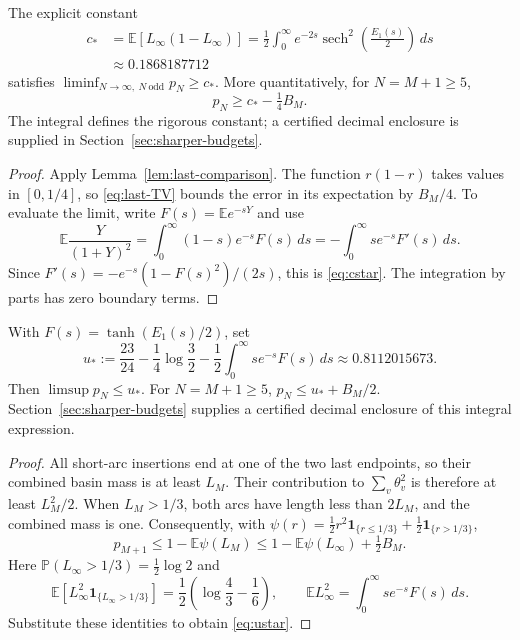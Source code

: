 \documentclass[11pt,letterpaper]{article}
\newcommand{\PP}{\mathbb P}\newcommand{\EE}{\mathbb E}
\newcommand{\ind}{\mathbf 1}\newcommand{\Exp}{\operatorname{Exp}}
\begin{document}
\begin{corollary}\label{cor:strong-noise}
The explicit constant
\begin{align}
 c_*&=\EE[L_\infty(1-L_\infty)]
 =\frac12\int_0^\infty e^{-2s}
          \operatorname{sech}^2\!\left(\frac{E_1(s)}2\right)\,ds
 \label{eq:cstar}\\
 &\approx0.1868187712\nonumber
\end{align}
satisfies $\liminf_{N\to\infty,\ N\ \mathrm{odd}}p_N\ge c_*$.
More quantitatively, for $N=M+1\ge5$,
\begin{equation}\label{eq:strong-finite}
 p_N\ge c_*-\tfrac14B_M.
\end{equation}
The integral defines the rigorous constant; a certified decimal
enclosure is supplied in Section~\ref{sec:sharper-budgets}.
\end{corollary}
\begin{proof}
Apply Lemma~\ref{lem:last-comparison}. The function $r(1-r)$ takes values
in $[0,1/4]$, so \eqref{eq:last-TV} bounds the error in its expectation
by $B_M/4$. To evaluate the limit, write $F(s)=\EE e^{-sY}$ and use
\[
 \EE\frac{Y}{(1+Y)^2}
 =\int_0^\infty(1-s)e^{-s}F(s)\,ds
 =-\int_0^\infty se^{-s}F'(s)\,ds.
\]
Since $F'(s)=-e^{-s}(1-F(s)^2)/(2s)$, this is \eqref{eq:cstar}.
The integration by parts has zero boundary terms.
\end{proof}

\begin{corollary}\label{cor:upper-noise}
With $F(s)=\tanh(E_1(s)/2)$, set
\begin{equation}\label{eq:ustar}
 u_*:=\frac{23}{24}-\frac14\log\frac32
        -\frac12\int_0^\infty se^{-s}F(s)\,ds
       \approx0.8112015673.
\end{equation}
Then $\limsup p_N\le u_*$. For $N=M+1\ge5$,
$p_N\le u_*+B_M/2$. Section~\ref{sec:sharper-budgets} supplies a
certified decimal enclosure of this integral expression.
\end{corollary}
\begin{proof}
All short-arc insertions end at one of the two last endpoints, so their
combined basin mass is at least $L_M$. Their contribution to
$\sum_v\theta_v^2$ is therefore at least $L_M^2/2$. When $L_M>1/3$,
both arcs have length less than $2L_M$, and the combined mass is one.
Consequently, with
$\psi(r)=\tfrac12r^2\ind_{\{r\le1/3\}}+\tfrac12\ind_{\{r>1/3\}}$,
\[
 p_{M+1}\le1-\EE\psi(L_M)
 \le1-\EE\psi(L_\infty)+\tfrac12B_M.
\]
Here $\PP(L_\infty>1/3)=\tfrac12\log2$ and
\[
 \EE[L_\infty^2\ind_{\{L_\infty>1/3\}}]
 =\frac12\left(\log\frac43-\frac16\right),\qquad
 \EE L_\infty^2=\int_0^\infty se^{-s}F(s)\,ds.
\]
Substitute these identities to obtain \eqref{eq:ustar}.
\end{proof}
\end{document}
